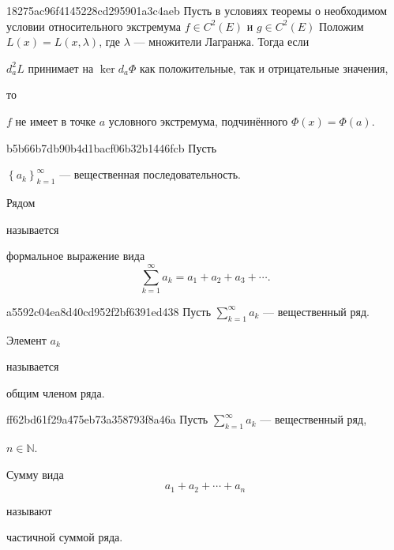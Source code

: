 \begin{note}{18275ac96f4145228cd295901a3c4aeb}
    Пусть в условиях теоремы о необходимом условии относительного экстремума \({ f \in C^{2}(E) }\) и \({ g \in C^{2}(E) }\)
    Положим \({ L(x) = L(x, \lambda) }\), где \({ \lambda }\) --- множители Лагранжа.
    Тогда если \begin{icloze}{1}\({ d_{a}^2 L }\) принимает на \({ \ker d_{a}\Phi }\) как положительные, так и отрицательные значения,\end{icloze} то \begin{icloze}{2}\({ f }\) не имеет в точке \({ a }\) условного экстремума, подчинённого \({ \Phi(x) = \Phi(a) }\).\end{icloze}
\end{note}

\begin{note}{b5b66b7db90b4d1bacf06b32b1446fcb}
    Пусть \begin{icloze}{3}\({ \left\{ a_k \right\}_{k=1}^{\infty} }\) --- вещественная последовательность.\end{icloze}
    \begin{icloze}{2}Рядом\end{icloze} называется
    \begin{icloze}{1}
        формальное выражение вида
        \[
            \sum_{k=1}^{\infty} a_k = a_1 + a_2 + a_3 + \cdots.
        \]
    \end{icloze}
\end{note}

\begin{note}{a5592c04ea8d40cd952f2bf6391ed438}
    Пусть \({ \sum_{k=1}^{\infty} a_k }\) --- вещественный ряд.
    \begin{icloze}{2}Элемент \({ a_k }\)\end{icloze} называется \begin{icloze}{1}общим членом ряда.\end{icloze}
\end{note}

\begin{note}{ff62bd61f29a475eb73a358793f8a46a}
    Пусть \({ \sum_{k=1}^{\infty} a_k }\) --- вещественный ряд, \begin{icloze}{3}\({ n \in \mathbb N }\).\end{icloze}
    \begin{icloze}{2}
        Сумму вида
        \[
            a_1 + a_2 + \cdots + a_n
        \]
    \end{icloze}
    называют \begin{icloze}{1}частичной суммой ряда.\end{icloze}
\end{note}

